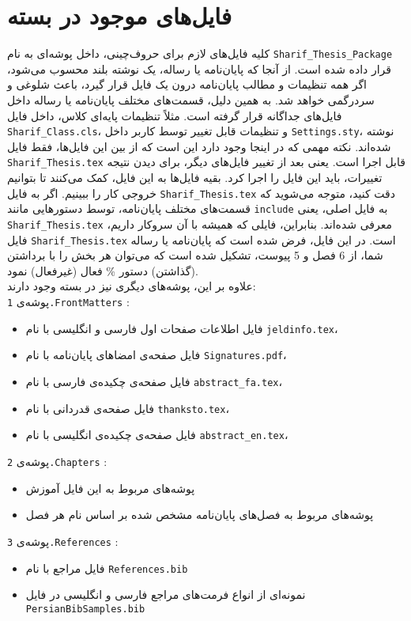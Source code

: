 \section{فایل‌های موجود در بسته}
کلیه فایل‌های لازم برای حروف‌چینی، داخل پوشه‌ای به نام 
\verb!Sharif_Thesis_Package!
 قرار داده شده است. از آنجا که پایان‌نامه یا رساله، یک نوشته بلند محسوب می‌شود، اگر همه تنظیمات و مطالب پایان‌نامه درون یک فایل قرار گیرد، باعث شلوغی و سردرگمی خواهد شد. به همین دلیل، قسمت‌های مختلف پایان‌نامه یا رساله داخل فایل‌های جداگانه قرار گرفته است. مثلاً تنظیمات پایه‌ای کلاس، داخل فایل
\verb!Sharif_Class.cls!، 
و تنظیمات قابل تغییر توسط کاربر داخل
\verb!Settings.sty!،
نوشته شده‌اند. نکته مهمی که در اینجا وجود دارد این است که از بین این  فایل‌ها، فقط فایل 
\verb!Sharif_Thesis.tex!
قابل اجرا است. یعنی بعد از تغییر فایل‌های دیگر، برای دیدن نتیجه تغییرات، باید این فایل را اجرا کرد. بقیه فایل‌ها به این فایل، کمک می‌کنند تا بتوانیم خروجی کار را ببینیم. اگر به فایل 
\verb!Sharif_Thesis.tex!
دقت کنید، متوجه می‌شوید که قسمت‌های مختلف پایان‌نامه، توسط دستورهایی مانند 
\verb!include!
به فایل اصلی، یعنی 
\verb!Sharif_Thesis.tex!
معرفی شده‌اند. بنابراین، فایلی که همیشه با آن سروکار داریم، فایل 
\verb!Sharif_Thesis.tex!
است. در این فایل، فرض شده است که پایان‌نامه یا رساله شما، از 6 فصل و 5 پیوست، تشکیل شده است که می‌توان هر بخش را با برداشتن (گذاشتن) دستور \% فعال (غیرفعال) نمود. \\
علاوه بر این، پوشه‌های دیگری نیز در بسته وجود دارند:\\
پوشه‌ی
\verb!1.FrontMatters! :
\begin{itemize}
\item
فایل‌ اطلاعات صفحات اول فارسی و انگلیسی با نام
\verb!jeldinfo.tex!،
\item
فایل‌ صفحه‌ی امضاهای پایان‌نامه با نام
\verb!Signatures.pdf!،
\item
فایل‌ صفحه‌ی چکیده‌ی فارسی با نام
\verb!abstract_fa.tex!،
\item
فایل‌ صفحه‌ی قدردانی با نام
\verb!thanksto.tex!،
\item
فایل‌ صفحه‌ی چکیده‌ی انگلیسی با نام
\verb!abstract_en.tex!،
\end{itemize}
پوشه‌ی
\verb!2.Chapters! :
\begin{itemize}
\item
پوشه‌های مربوط به این فایل آموزش
\item
پوشه‌های مربوط به فصل‌های پایان‌نامه مشخص شده بر اساس نام هر فصل
\end{itemize}
پوشه‌ی
\verb!3.References! :
\begin{itemize}
\item
فایل مراجع با نام 
\verb!References.bib!
\item
نمونه‌ای از انواع فرمت‌های مراجع فارسی و انگلیسی در فایل 
\verb!PersianBibSamples.bib!
\end{itemize}

